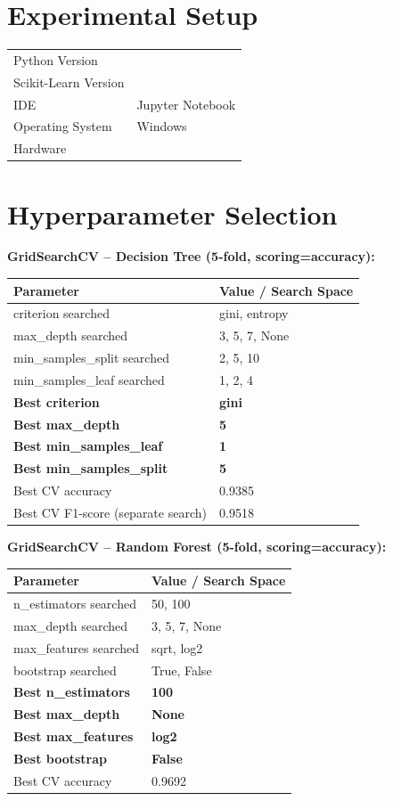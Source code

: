 \documentclass[12pt,a4paper]{article}
\begin{document}
\section{Experimental Setup}
\begin{tabular}{ll}
\toprule
Python Version & \\
Scikit-Learn Version & \\
IDE & Jupyter Notebook \\
Operating System & Windows \\
Hardware & \\
\bottomrule
\end{tabular}

\section{Hyperparameter Selection}

\textbf{GridSearchCV -- Decision Tree (5-fold, scoring=accuracy):}
\begin{tabular}{ll}
\toprule
Parameter & Value / Search Space\\
\midrule
criterion searched & gini, entropy \\
max\_depth searched & 3, 5, 7, None \\
min\_samples\_split searched & 2, 5, 10 \\
min\_samples\_leaf searched & 1, 2, 4 \\
\textbf{Best criterion} & \textbf{gini} \\
\textbf{Best max\_depth} & \textbf{5} \\
\textbf{Best min\_samples\_leaf} & \textbf{1} \\
\textbf{Best min\_samples\_split} & \textbf{5} \\
Best CV accuracy & 0.9385 \\
Best CV F1-score (separate search) & 0.9518 \\
\bottomrule
\end{tabular}

\vspace{0.3cm}
\textbf{GridSearchCV -- Random Forest (5-fold, scoring=accuracy):}
\begin{tabular}{ll}
\toprule
Parameter & Value / Search Space\\
\midrule
n\_estimators searched & 50, 100 \\
max\_depth searched & 3, 5, 7, None \\
max\_features searched & sqrt, log2 \\
bootstrap searched & True, False \\
\textbf{Best n\_estimators} & \textbf{100} \\
\textbf{Best max\_depth} & \textbf{None} \\
\textbf{Best max\_features} & \textbf{log2} \\
\textbf{Best bootstrap} & \textbf{False} \\
Best CV accuracy & 0.9692 \\
\bottomrule
\end{tabular}
\end{document}
